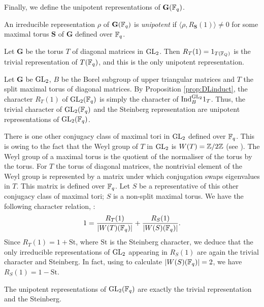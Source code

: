Finally, we define the unipotent representations of $\mathbf G(\mathbb{F}_q)$.

\begin{defn}
    An irreducible representation $\rho$ of $\mathbf G(\mathbb{F}_q)$ is \textit{unipotent} if $\langle \rho, R_{\mathbf S}(1)\rangle \neq 0$ for some maximal torus $\mathbf S$ of $\mathbf G$ defined over $\mathbb{F}_q$.
\end{defn}



\begin{example}\label{ex:uniT}
    Let $\mathbf G$ be the torus $T$ of diagonal matrices in $\mathrm{GL}_2$. Then $R_T(1) = 1_{T(\mathbb{F}_Q)}$ is the trivial representation of $T(\mathbb{F}_q)$, and this is the only unipotent representation.
\end{example}

\begin{example}\label{ex:uniG}
    Let $\mathbf G$ be $\mathrm{GL}_2$, $B$ be the Borel subgroup of upper triangular matrices and $T$ the split maximal torus of diagonal matrices. By Proposition \ref{prop:DLinduct}, the character $R_T(1)$ of $\mathrm{GL}_2(\mathbb{F}_q)$ is simply the character of $\mathrm{Ind}_{B}^{\mathrm{GL}_2}1_{T}$. Thus, the trivial character of $\mathrm{GL}_2(\mathbb{F}_q)$ and the Steinberg representation are unipotent representations of $\mathrm{GL}_2(\mathbb{F}_q)$. 
    
    There is one other conjugacy class of maximal tori in $\mathrm{GL}_2$ defined over $\mathbb{F}_q$. This is owing to the fact that the Weyl group of $T$ in $\mathrm{GL}_2$ is $W(T) = \mathbb{Z}/2\mathbb{Z}$ (see \cite[Proposition 3.3.3]{BH1}). The Weyl group of a maximal torus is the quotient of the normaliser of the torus by the torus. For $T$ the torus of diagonal matrices, the nontrivial element of the Weyl group is represented by a matrix under which conjugation swaps eigenvalues in $T$. This matrix is defined over $\mathbb{F}_q$. Let $S$ be a representative of this other conjugacy class of maximal tori; $S$ is a non-split maximal torus. We have the following character relation, \cite[Corollary 7.6.5]{BH1}:
    $$1 = \frac{R_{T}(1)}{|W(T)(\mathbb{F}_q)|} + \frac{R_{S}(1)}{|W(S)(\mathbb{F}_q)|}.$$ Since $R_{T}(1) = 1+\mathrm{St}$, where $\mathrm{St}$ is the Steinberg character, we deduce that the only irreducible representations of $\mathrm{GL}_2$ appearing in $R_S(1)$ are again the trivial character and Steinberg. In fact, using \cite[Proposition 3.3.6]{BH1} to calculate $|W(S)(\mathbb{F}_q)|=2$, we have $R_S(1) = 1-\mathrm{St}$.

    The unipotent representations of $\mathrm{GL}_2(\mathbb{F}_q)$ are exactly the trivial representation and the Steinberg.
\end{example}


